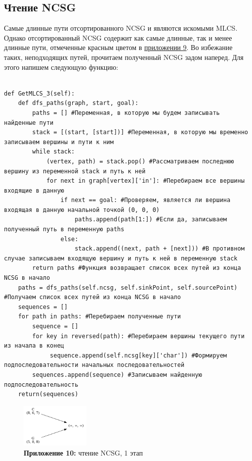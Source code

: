 \documentclass[a4paper,12pt]{extarticle}
\begin{document}
\subsection{Чтение NCSG}

Самые длинные пути отсортированного NCSG и являются искомыми MLCS. Однако отсортированный NCSG содержит как самые длинные, так и менее длинные пути, отмеченные красным цветом в \hyperref[ncsg:4]{приложении 9}. Во избежание таких, неподходящих путей, прочитаем полученный NCSG задом наперед. Для этого напишем следующую функцию:

\begin{verbatim}

def GetMLCS_3(self):
    def dfs_paths(graph, start, goal):
        paths = [] #Переменная, в которую мы будем записывать найденные пути
        stack = [(start, [start])] #Переменная, в которую мы временно записываем вершины и пути к ним
        while stack:
            (vertex, path) = stack.pop() #Рассматриваем последнюю вершину из переменной stack и путь к ней
            for next in graph[vertex]['in']: #Перебираем все вершины входящие в данную
                if next == goal: #Проверяем, является ли вершина входящая в данную начальной точкой (0, 0, 0)
                    paths.append(path[1:]) #Если да, записываем полученный путь в переменную paths
                else:
                    stack.append((next, path + [next])) #В противном случае записываем входящую вершину и путь к ней в переменную stack
        return paths #Функция возвращает список всех путей из конца NCSG в начало
    paths = dfs_paths(self.ncsg, self.sinkPoint, self.sourcePoint) #Получаем список всех путей из конца NCSG в начало
    sequences = []
    for path in paths: #Перебираем полученные пути
        sequence = []
        for key in reversed(path): #Перебираем вершины текущего пути из начала в конец
             sequence.append(self.ncsg[key]['char']) #Формируем подпоследовательности начальных последовательностей
        sequences.append(sequence) #Записываем найденную подпоследовательность
    return(sequences)

\end{verbatim}

\begin{figure}
  \captionsetup{justification=centering}
  \caption*{\textbf{Приложение 10:} чтение NCSG, 1 этап}
  \includegraphics[width=0.3\textwidth]{Graph_7.png}
\end{figure}
\end{document}
